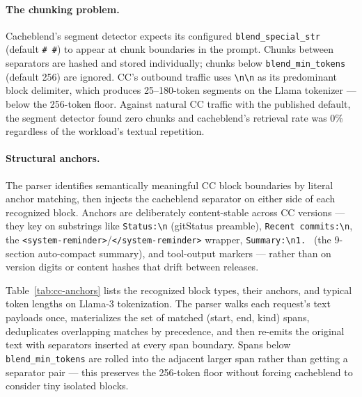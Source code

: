 \paragraph{The chunking problem.} Cacheblend's segment detector
expects its configured \texttt{blend\_special\_str} (default
\texttt{\#\,\#}) to appear at chunk boundaries in the prompt. Chunks
between separators are hashed and stored individually; chunks below
\texttt{blend\_min\_tokens} (default 256) are ignored. CC's outbound
traffic uses \texttt{\textbackslash n\textbackslash n} as its
predominant block delimiter, which produces 25--180-token segments on
the Llama tokenizer --- below the 256-token floor. Against natural CC
traffic with the published default, the segment detector found zero
chunks and cacheblend's retrieval rate was 0\% regardless of the
workload's textual repetition.

\paragraph{Structural anchors.} The parser identifies semantically
meaningful CC block boundaries by literal anchor matching, then
injects the cacheblend separator on either side of each recognized
block. Anchors are deliberately content-stable across CC versions ---
they key on substrings like \texttt{Status:\textbackslash n} (gitStatus
preamble), \texttt{Recent commits:\textbackslash n}, the
\texttt{<system-reminder>}/\texttt{</system-reminder>} wrapper,
\texttt{Summary:\textbackslash n1.\ } (the 9-section auto-compact
summary), and tool-output markers --- rather than on version digits
or content hashes that drift between releases.

Table~\ref{tab:cc-anchors} lists the recognized block types, their
anchors, and typical token lengths on Llama-3 tokenization. The parser
walks each request's text payloads once, materializes the set of
matched (start, end, kind) spans, deduplicates overlapping matches by
precedence, and then re-emits the original text with separators
inserted at every span boundary. Spans below \texttt{blend\_min\_tokens}
are rolled into the adjacent larger span rather than getting a
separator pair --- this preserves the 256-token floor without forcing
cacheblend to consider tiny isolated blocks.

